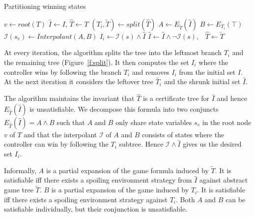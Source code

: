 \begin{algorithm}[t]
   \caption{Partitioning winning states}\label{alg:strat:partition}
   \begin{algorithmic}[1]
        \State $v \gets root(T)$
            \State $\hat{I} \gets I$, $\hat{T} \gets T$ 
            \State $(T_i, \tilde{T}) \gets split(\hat{T})$\label{alg:partition:split}
            \State $A \gets E_{\tilde{T}}(\hat{I}) $ \label{alg:strat:partition:Bi}
            \State $B \gets E_{T_i}(\top)$\label{alg:strat:partition:Ai}
            \State $\mathcal{I}(s_v) \gets Interpolant(A, B)$\label{alg:partition:I}
            \State $I_i \gets \mathcal{I}(s) \land \hat{I}$\label{alg:partition:Ii}
            \State $\hat{I} \gets \hat{I} \land \neg\mathcal{I}(s)$,~~$\hat{T} \gets \tilde{T}$\label{alg:partition:upd}
            \EndFor
            \State \Return{$[(T_1, I_1),\ldots, (T_j, I_j)]$} \label{alg:strat:partition:return}
        \EndFunction
    \end{algorithmic}
\end{algorithm}

At every iteration, the algorithm splits the tree into the
leftmost branch $T_i$ and the remaining tree (Figure~\ref{f:split}).
It then computes the set $I_i$ where the controller wins by following
the branch $T_i$ and removes $I_i$ from the initial set $I$.  At the
next iteration it considers the leftover tree $\tilde{T_i}$ and the
shrunk initial set $\hat{I}$.



The algorithm maintains the invariant that $\hat{T}$ is a
certificate tree for $\hat{I}$ and hence $E_{\hat{T}}(\hat{I})$ is
unsatisfiable.  We decompose this formula into two conjuncts
$E_{\hat{T}}(\hat{I}) =A \land B$ such that $A$ and $B$ only share
state variables $s_v$ in the root node $v$ of $T$ and that the
interpolant $\mathcal{I}$ of $A$ and $B$ consists of states where
the controller can win by following the $T_i$ subtree.  Hence
$\mathcal{I}\land \hat{I}$ gives us the desired set $I_i$.

Informally, $A$ is a partial expansion of the game formula induced by
$\tilde{T}$.  It is satisfiable iff there exists a spoiling environment
strategy from $\hat{I}$ against abstract game tree $\tilde{T}$.
$B$ is a partial expansion of the game induced by $T_i$.  It is satisfiable
iff there exists a spoiling environment strategy against $T_i$.
Both $A$ and $B$ can be satisfiable individually, but their conjunction
is unsatisfiable.

